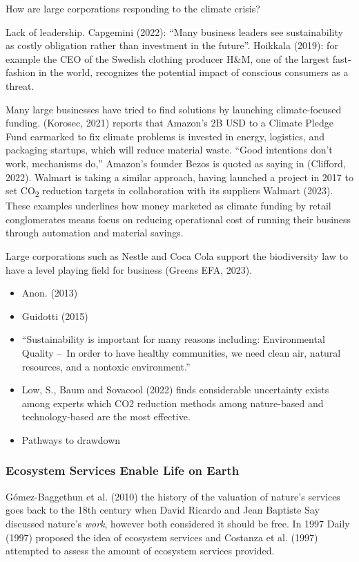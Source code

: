 \documentclass[
  letterpaper,
  DIV=11,
  numbers=noendperiod]{scrartcl}
\begin{document}
How are large corporations responding to the climate crisis?

Lack of leadership. Capgemini (2022): ``Many business leaders see
sustainability as costly obligation rather than investment in the
future''. Hoikkala (2019): for example the CEO of the Swedish clothing
producer H\&M, one of the largest fast-fashion in the world, recognizes
the potential impact of conscious consumers as a threat.

Many large businesses have tried to find solutions by launching
climate-focused funding. (Korosec, 2021) reports that Amazon's 2B USD to
a Climate Pledge Fund earmarked to fix climate problems is invested in
energy, logistics, and packaging startups, which will reduce material
waste. ``Good intentions don't work, mechanisms do,'' Amazon's founder
Bezos is quoted as saying in (Clifford, 2022). Walmart is taking a
similar approach, having launched a project in 2017 to set
CO\textsubscript{2} reduction targets in collaboration with its
suppliers Walmart (2023). These examples underlines how money marketed
as climate funding by retail conglomerates means focus on reducing
operational cost of running their business through automation and
material savings.

Large corporations such as Nestle and Coca Cola support the biodiversity
law to have a level playing field for business (Greens EFA, 2023).

\begin{itemize}
\item
  Anon. (2013)
\item
  Guidotti (2015)
\item
  ``Sustainability is important for many reasons including:
  Environmental Quality --~In order to have healthy communities, we need
  clean air, natural resources, and a nontoxic environment.''
\item
  Low, S., Baum and Sovacool (2022) finds considerable uncertainty
  exists among experts which CO2 reduction methods among nature-based
  and technology-based are the most effective.
\item
  Pathways to drawdown
\end{itemize}

\subsubsection{Ecosystem Services Enable Life on
Earth}\label{ecosystem-services-enable-life-on-earth}

Gómez-Baggethun et al. (2010) the history of the valuation of nature's
services goes back to the 18th century when David Ricardo and Jean
Baptiste Say discussed nature's \emph{work}, however both considered it
should be free. In 1997 Daily (1997) proposed the idea of ecosystem
services and Costanza et al. (1997) attempted to assess the amount of
ecosystem services provided.
\end{document}
